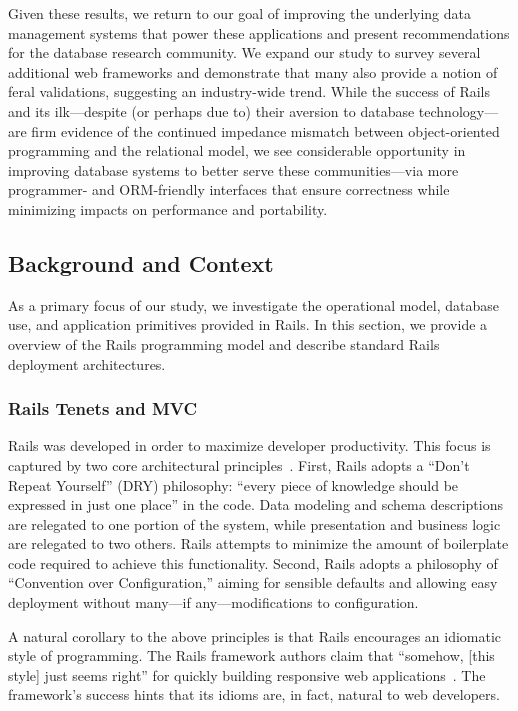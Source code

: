 Given these results, we return to our goal of improving the underlying
data management systems that power these applications and present
recommendations for the database research community. We expand our
study to survey several additional web frameworks and demonstrate that
many also provide a notion of feral validations, suggesting an
industry-wide trend. While the success of Rails and its ilk---despite
(or perhaps due to) their aversion to database technology---are firm
evidence of the continued impedance mismatch between object-oriented
programming and the relational model, we see considerable opportunity
in improving database systems to better serve these communities---via
more programmer- and ORM-friendly interfaces that ensure correctness
while minimizing impacts on performance and portability.

\subsection{Background and Context}
\label{sec:motivation}

As a primary focus of our study, we investigate the operational model, database use, and application primitives provided in Rails. In this section, we provide a overview of the Rails programming model and describe standard Rails deployment architectures.

\subsubsection{Rails Tenets and MVC}
\label{sec:mvc}

Rails was developed in order to maximize developer productivity. This focus is captured by two core architectural principles~\cite{rails-book}. First, Rails adopts a ``Don't Repeat Yourself'' (DRY) philosophy: ``every piece of knowledge should be expressed in just one place'' in the code. Data modeling and schema descriptions are relegated to one portion of the system, while presentation and business logic are relegated to two others. Rails attempts to minimize the amount of boilerplate code required to achieve this functionality. Second, Rails adopts a philosophy of ``Convention over Configuration,'' aiming for sensible defaults and allowing easy deployment without many---if any---modifications to configuration.

A natural corollary to the above principles is that Rails encourages an idiomatic style of programming. The Rails framework authors claim that ``somehow, [this style] just seems right'' for quickly building responsive web applications~\cite{rails-book}. The framework's success hints that its idioms are, in fact, natural to web developers.

